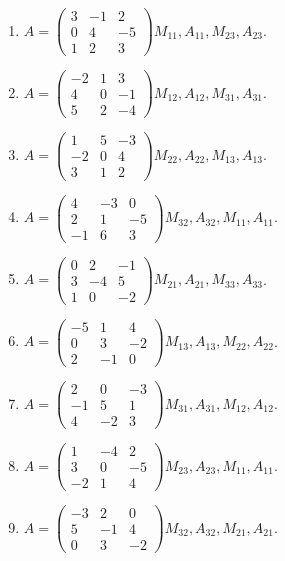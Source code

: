 \begin{enumerate}[label=\arabic*.,  leftmargin=*]
\item $A=\begin{pmatrix}3&-1&2\\0&4&-5\\1&2&3\end{pmatrix}$\quad $M_{11}, A_{11}, M_{23}, A_{23}$.
\item $A=\begin{pmatrix}-2&1&3\\4&0&-1\\5&2&-4\end{pmatrix}$\quad $M_{12}, A_{12}, M_{31}, A_{31}$.
\item $A=\begin{pmatrix}1&5&-3\\-2&0&4\\3&1&2\end{pmatrix}$\quad $M_{22}, A_{22}, M_{13}, A_{13}$.
\item $A=\begin{pmatrix}4&-3&0\\2&1&-5\\-1&6&3\end{pmatrix}$\quad $M_{32}, A_{32}, M_{11}, A_{11}$.
\item $A=\begin{pmatrix}0&2&-1\\3&-4&5\\1&0&-2\end{pmatrix}$\quad $M_{21}, A_{21}, M_{33}, A_{33}$.
\item $A=\begin{pmatrix}-5&1&4\\0&3&-2\\2&-1&0\end{pmatrix}$\quad $M_{13}, A_{13}, M_{22}, A_{22}$.
\item $A=\begin{pmatrix}2&0&-3\\-1&5&1\\4&-2&3\end{pmatrix}$\quad $M_{31}, A_{31}, M_{12}, A_{12}$.
\item $A=\begin{pmatrix}1&-4&2\\3&0&-5\\-2&1&4\end{pmatrix}$\quad $M_{23}, A_{23}, M_{11}, A_{11}$.
\item $A=\begin{pmatrix}-3&2&0\\5&-1&4\\0&3&-2\end{pmatrix}$\quad $M_{32}, A_{32}, M_{21}, A_{21}$.

\end{enumerate}
